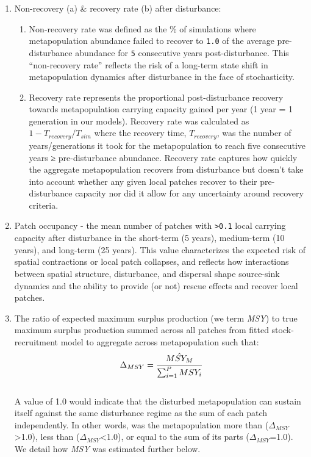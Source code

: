 \documentclass[
]{article}
\providecommand{\tightlist}{%
  \setlength{\itemsep}{0pt}\setlength{\parskip}{0pt}}
\begin{document}
\begin{enumerate}
\def\labelenumi{\arabic{enumi}.}
\item
  Non-recovery (a) \& recovery rate (b) after disturbance:

  \begin{enumerate}
  \def\labelenumii{\alph{enumii}.}
  \tightlist
  \item
    Non-recovery rate was defined as the \% of simulations where
    metapopulation abundance failed to recover to \texttt{1.0} of the
    average pre-disturbance abundance for \texttt{5} consecutive years
    post-disturbance. This ``non-recovery rate'' reflects the risk of a
    long-term state shift in metapopulation dynamics after disturbance
    in the face of stochasticity.
  \item
    Recovery rate represents the proportional post-disturbance recovery
    towards metapopulation carrying capacity gained per year (1 year = 1
    generation in our models). Recovery rate was calculated as
    \(1-T_{recovery}/T_{sim}\) where the recovery time,
    \(T_{recovery}\), was the number of years/generations it took for
    the metapopulation to reach five consecutive years ≥ pre-disturbance
    abundance. Recovery rate captures how quickly the aggregate
    metapopulation recovers from disturbance but doesn't take into
    account whether any given local patches recover to their
    pre-disturbance capacity nor did it allow for any uncertainty around
    recovery criteria.
  \end{enumerate}
\item
  Patch occupancy - the mean number of patches with
  \texttt{\textgreater{}0.1} local carrying capacity after disturbance
  in the short-term (5 years), medium-term (10 years), and long-term (25
  years). This value characterizes the expected risk of spatial
  contractions or local patch collapses, and reflects how interactions
  between spatial structure, disturbance, and dispersal shape
  source-sink dynamics and the ability to provide (or not) rescue
  effects and recover local patches.
\item
  The ratio of expected maximum surplus production (we term \emph{MSY})
  to true maximum surplus production summed across all patches from
  fitted stock-recruitment model to aggregate across metapopulation such
  that:\\
  \begin{align}
  \Delta_{MSY}=\cfrac{\hat{MSY_M}}{\sum_{i=1}^{P} MSY_{i}}
  \end{align}\\
  A value of 1.0 would indicate that the disturbed metapopulation can
  sustain itself against the same disturbance regime as the sum of each
  patch independently. In other words, was the metapopulation more than
  (\(\Delta_{MSY}\)\textgreater1.0), less than
  (\(\Delta_{MSY}\)\textless1.0), or equal to the sum of its parts
  (\(\Delta_{MSY}\)=1.0). We detail how \emph{MSY} was estimated further
  below.
\end{enumerate}
\end{document}
